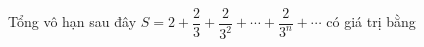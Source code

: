 \begin{ex}
Tổng vô hạn sau đây $S=2+\dfrac23+\dfrac2{3^2}+\cdots+\dfrac2{3^n}+\cdots$ có giá trị bằng
\end{ex}
